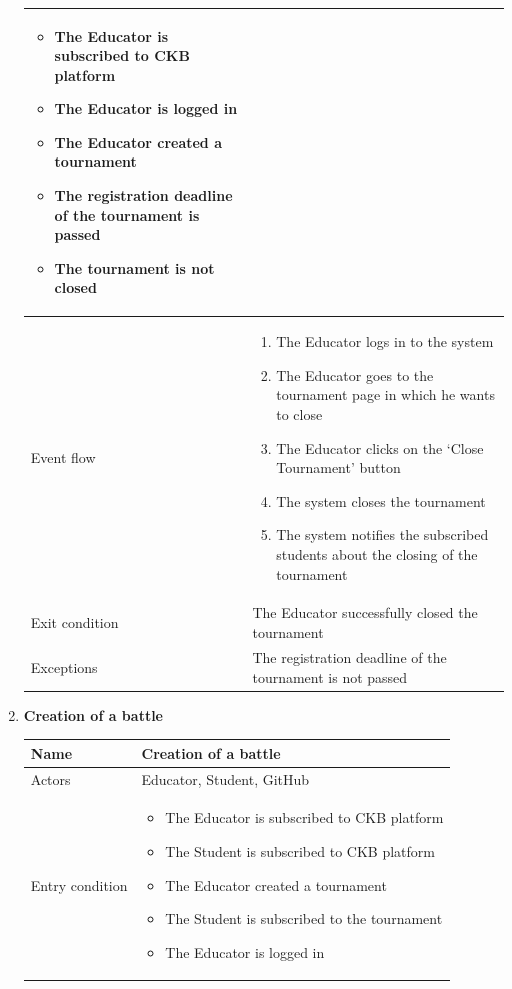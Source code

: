 \begin{enumerate}[label=UC\arabic*:]
\begin{tabular}{|p{3cm}|p{8cm}|}
\begin{itemize}
        \item The Educator is subscribed to CKB platform
        \item The Educator is logged in 
        \item The Educator created a tournament
        \item The registration deadline of the tournament is passed
        \item The tournament is not closed
    \end{itemize}
    \\
    \hline
    Event flow &
    \begin{enumerate}[label=\arabic*.]
        \item The Educator logs in to the system
        \item The Educator goes to the tournament page in which he wants to close
        \item The Educator clicks on the `Close Tournament' button
        \item The system closes the tournament
        \item The system notifies the subscribed students about the closing of the tournament
    \end{enumerate}
    \\
    \hline
    Exit condition & The Educator successfully closed the tournament \\
    \hline
    Exceptions & The registration deadline of the tournament is not passed \\
    \hline
    \end{tabular}
    \item \textbf{Creation of a battle} \\
    \begin{tabular}{|p{3cm}|p{8cm}|}
        \hline
        Name & Creation of a battle \\
        \hline
        Actors & Educator, Student, GitHub \\
        \hline
        Entry condition &
        \begin{itemize}
            \item The Educator is subscribed to CKB platform
            \item The Student is subscribed to CKB platform
            \item The Educator created a tournament
            \item The Student is subscribed to the tournament
            \item The Educator is logged in

\end{itemize}
\end{tabular}
\end{enumerate}
